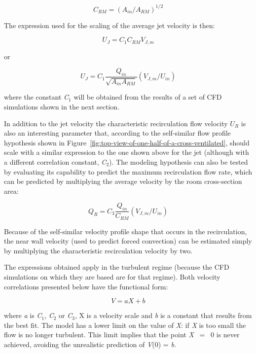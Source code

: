 {\begin{equation}
{C_{RM}} = {\left( {{A_{in}}/{A_{RM}}} \right)^{1/2}}
\end{equation}

The expression used for the scaling of the average jet velocity is then:

\begin{equation}
{U_J} = {C_1}{C_{RM}}{V_{J,m}}
\end{equation}

or

\begin{equation}
{U_J} = {C_1}\frac{{{Q_{in}}}}{{\sqrt {{A_{in}}{A_{RM}}} }}\left( {{V_{J,m}}/{U_{in}}} \right)
\end{equation}

where the constant \emph{C}\(_{1}\) will be obtained from the results of a set of CFD simulations shown in the next section.

In addition to the jet velocity the characteristic recirculation flow velocity \({U_R}\) is also an interesting parameter that, according to the self-similar flow profile hypothesis shown in Figure~\ref{fig:top-view-of-one-half-of-a-cross-ventilated}, should scale with a similar expression to the one shown above for the jet (although with a different correlation constant, \emph{C}\(_{2}\)). The modeling hypothesis can also be tested by evaluating its capability to predict the maximum recirculation flow rate, which can be predicted by multiplying the average velocity by the room cross-section area:

\begin{equation}
{Q_R} = {C_3}\frac{{{Q_{in}}}}{{{C_{RM}}}}\left( {{V_{J,m}}/{U_{in}}} \right)
\end{equation}

Because of the self-similar velocity profile shape that occurs in the recirculation, the near wall velocity (used to predict forced convection) can be estimated simply by multiplying the characteristic recirculation velocity by two.

The expressions obtained apply in the turbulent regime (because the CFD simulations on which they are based are for that regime). Both velocity correlations presented below have the functional form:

\begin{equation}
V = aX + b
\end{equation}

where \emph{a} is \emph{C}\(_{1}\), \emph{C}\(_{2}\) or \emph{C}\(_{3}\), X is a velocity scale and \emph{b} is a constant that results from the best fit. The model has a lower limit on the value of \emph{X}: if \emph{X} is too small the flow is no longer turbulent. This limit implies that the point \emph{X}~ = ~0 is never achieved, avoiding the unrealistic prediction of \emph{V}(0) = \emph{b}.

}
